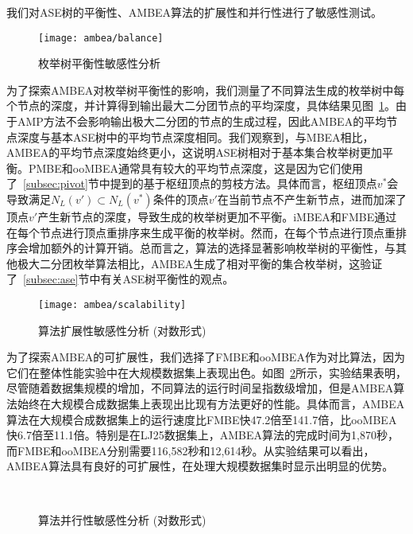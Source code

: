 我们对ASE树的平衡性、AMBEA算法的扩展性和并行性进行了敏感性测试。

\begin{figure} [H]
	\centering
	\texttt{[image: ambea/balance]}
	\caption{枚举树平衡性敏感性分析}
	\label{fig:ambea_exp_balance}
\end{figure}

为了探索AMBEA对枚举树平衡性的影响，我们测量了不同算法生成的枚举树中每个节点的深度，并计算得到输出最大二分团节点的平均深度，具体结果见图~\ref{fig:ambea_exp_balance}。由于AMP方法不会影响输出极大二分团的节点的生成过程，因此AMBEA的平均节点深度与基本ASE树中的平均节点深度相同。我们观察到，与MBEA相比，AMBEA的平均节点深度始终更小，这说明ASE树相对于基本集合枚举树更加平衡。PMBE和ooMBEA通常具有较大的平均节点深度，这是因为它们使用了~\ref{subsec:pivot}节中提到的基于枢纽顶点的剪枝方法。具体而言，枢纽顶点$v^*$会导致满足$N_L(v')\subset N_L(v^*)$条件的顶点$v'$在当前节点不产生新节点，进而加深了顶点$v'$产生新节点的深度，导致生成的枚举树更加不平衡。iMBEA和FMBE通过在每个节点进行顶点重排序来生成平衡的枚举树。然而，在每个节点进行顶点重排序会增加额外的计算开销。总而言之，算法的选择显著影响枚举树的平衡性，与其他极大二分团枚举算法相比，AMBEA生成了相对平衡的集合枚举树，这验证了~\ref{subsec:ase}节中有关ASE树平衡性的观点。

\begin{figure} [H]
	\centering
	\texttt{[image: ambea/scalability]}
	\caption{算法扩展性敏感性分析 (对数形式)}
	\label{fig:ambea_exp_scalability}
\end{figure}

为了探索AMBEA的可扩展性，我们选择了FMBE和ooMBEA作为对比算法，因为它们在整体性能实验中在大规模数据集上表现出色。如图~\ref{fig:ambea_exp_scalability}所示，实验结果表明，尽管随着数据集规模的增加，不同算法的运行时间呈指数级增加，但是AMBEA算法始终在大规模合成数据集上表现出比现有方法更好的性能。具体而言，AMBEA算法在大规模合成数据集上的运行速度比FMBE快47.2倍至141.7倍，比ooMBEA快6.7倍至11.1倍。特别是在LJ25数据集上，AMBEA算法的完成时间为1,870秒，而FMBE和ooMBEA分别需要116,582秒和12,614秒。从实验结果可以看出，AMBEA算法具有良好的可扩展性，在处理大规模数据集时显示出明显的优势。


\begin{figure} [H]
	\centering
  \quad
  \\
  \quad
  

	\caption{算法并行性敏感性分析 (对数形式)}
	\label{fig:ambea_paral}
\end{figure}


